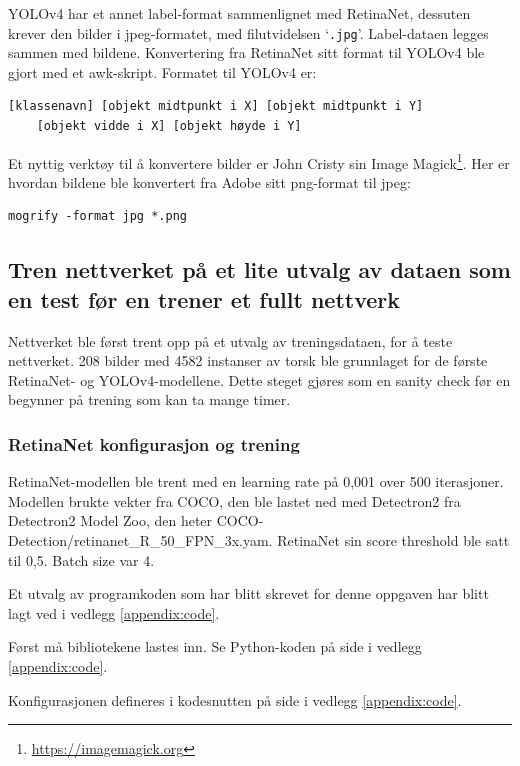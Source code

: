 YOLOv4 har et annet label-format sammenlignet med RetinaNet, dessuten krever den bilder i jpeg-formatet, med filutvidelsen `\texttt{.jpg}'. Label-dataen legges sammen med bildene. Konvertering fra RetinaNet sitt format til YOLOv4 ble gjort med et awk-skript. Formatet til YOLOv4 er:

\begin{verbatim}
[klassenavn] [objekt midtpunkt i X] [objekt midtpunkt i Y]
	[objekt vidde i X] [objekt høyde i Y]
\end{verbatim}

Et nyttig verktøy til å konvertere bilder er John Cristy sin Image Magick\footnote{\url{https://imagemagick.org}}. Her er hvordan bildene ble konvertert fra Adobe sitt png-format til jpeg:

\begin{verbatim}
mogrify -format jpg *.png
\end{verbatim}

\subsection{Tren nettverket på et lite utvalg av dataen som en test før en trener et fullt nettverk}

Nettverket ble først trent opp på et utvalg av treningsdataen, for å teste nettverket. 208 bilder med 4582 instanser av torsk ble grunnlaget for de første RetinaNet- og YOLOv4-modellene. Dette steget gjøres som en sanity check før en begynner på trening som kan ta mange timer.

\subsubsection{RetinaNet konfigurasjon og trening}
\label{part:training}

RetinaNet-modellen ble trent med en learning rate på 0,001 over 500 iterasjoner. Modellen brukte vekter fra COCO, den ble lastet ned med Detectron2 fra Detectron2 Model Zoo, den heter COCO-Detection/retinanet\_R\_50\_FPN\_3x.yam. RetinaNet sin score threshold ble satt til 0,5. Batch size var 4.

Et utvalg av programkoden som har blitt skrevet for denne oppgaven har blitt lagt ved i vedlegg \ref{appendix:code}.

Først må bibliotekene lastes inn. Se Python-koden på side \pageref{lst:load} i vedlegg \ref{appendix:code}.

Konfigurasjonen defineres i kodesnutten på side \pageref{lst:config} i vedlegg \ref{appendix:code}.

